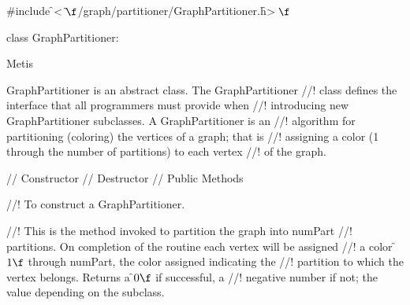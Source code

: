 
\indent \#include \f$<\tilde{ }\f$/graph/partitioner/GraphPartitioner.h\f$>\f$

\indent class GraphPartitioner:

\indent\indent Metis

\indent GraphPartitioner is an abstract class. The GraphPartitioner
//! class defines the interface that all programmers must provide when
//! introducing new GraphPartitioner subclasses. A GraphPartitioner is an
//! algorithm for partitioning (coloring) the vertices of a graph; that is
//! assigning a color (1 through the number of partitions) to each vertex
//! of the graph.

\indent\indent // Constructor
\indent{}
\indent\indent // Destructor
\indent{}
\indent\indent // Public Methods
\indent{}

//! To construct a GraphPartitioner.


//! This is the method invoked to partition the graph into \p numPart
//! partitions. On completion of the routine each vertex will be assigned
//! a color \f$1\f$ through \p numPart, the color assigned indicating the
//! partition to which the vertex belongs. Returns a \f$0\f$ if successful, a
//! negative number if not; the value depending on the subclass.



